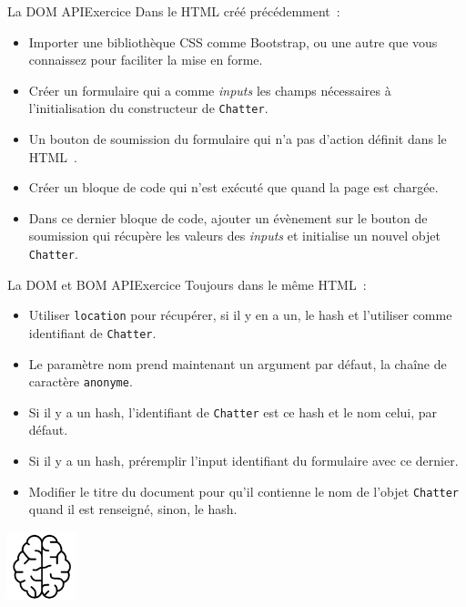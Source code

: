 \documentclass{beamer}
\begin{document}
    \begin{frame}{La DOM API}{Exercice \execcounterdispinc{}}
        Dans le HTML créé précédemment~:
        \begin{itemize}
            \item Importer une bibliothèque CSS comme Bootstrap, ou une autre que vous connaissez pour faciliter la mise en forme.
            \item Créer un formulaire qui a comme \textit{inputs} les champs nécessaires à l'initialisation du constructeur de \lstinline{Chatter}.
            \item Un bouton de soumission du formulaire qui n'a pas d'action définit dans le HTML~.
            \item Créer un bloque de code qui n'est exécuté que quand la page est chargée.
            \item Dans ce dernier bloque de code, ajouter un évènement sur le bouton de soumission qui récupère les valeurs des \textit{inputs} et initialise un nouvel objet \lstinline{Chatter}.
        \end{itemize}
    \end{frame}

    \begin{frame}{La DOM et BOM API}{Exercice \execcounterdispinc{}}
        Toujours dans le même HTML~:
        \begin{itemize}
            \item Utiliser \lstinline{location} pour récupérer, si il y en a un, le hash et l'utiliser comme identifiant de \lstinline{Chatter}.
            \item Le paramètre nom prend maintenant un argument par défaut, la chaîne de caractère \lstinline{anonyme}.
            \item Si il y a un hash, l'identifiant de \lstinline{Chatter} est ce hash et le nom celui, par défaut.
            \item Si il y a un hash, préremplir l'input identifiant du formulaire avec ce dernier.
            \item Modifier le titre du document pour qu'il contienne le nom de l'objet \lstinline{Chatter} quand il est renseigné, sinon, le hash.
        \end{itemize}
        \bigbreak
        \centering
        \includegraphics[width=2cm]{image/intelligence}
    \end{frame}
\end{document}
